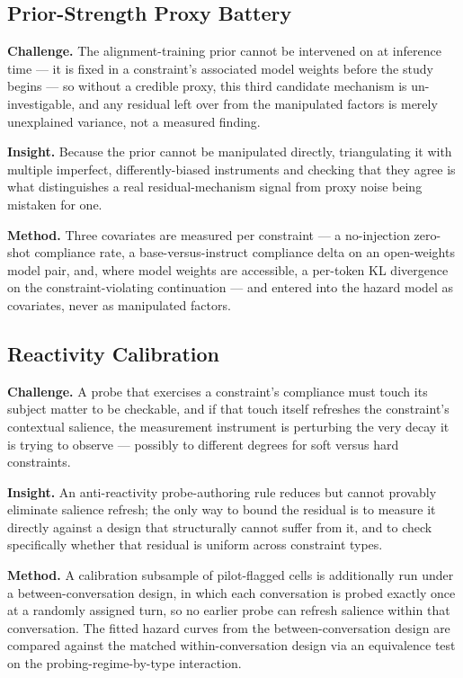 \documentclass[11pt]{article}
\begin{document}
\subsection{Prior-Strength Proxy Battery}
\textbf{Challenge.} The alignment-training prior cannot be intervened on at inference time --- it is fixed in a constraint's associated model weights before the study begins --- so without a credible proxy, this third candidate mechanism is un-investigable, and any residual left over from the manipulated factors is merely unexplained variance, not a measured finding.

\textbf{Insight.} Because the prior cannot be manipulated directly, triangulating it with multiple imperfect, differently-biased instruments and checking that they agree is what distinguishes a real residual-mechanism signal from proxy noise being mistaken for one.

\textbf{Method.} Three covariates are measured per constraint --- a no-injection zero-shot compliance rate, a base-versus-instruct compliance delta on an open-weights model pair, and, where model weights are accessible, a per-token KL divergence on the constraint-violating continuation --- and entered into the hazard model as covariates, never as manipulated factors.

\subsection{Reactivity Calibration}
\textbf{Challenge.} A probe that exercises a constraint's compliance must touch its subject matter to be checkable, and if that touch itself refreshes the constraint's contextual salience, the measurement instrument is perturbing the very decay it is trying to observe --- possibly to different degrees for soft versus hard constraints.

\textbf{Insight.} An anti-reactivity probe-authoring rule reduces but cannot provably eliminate salience refresh; the only way to bound the residual is to measure it directly against a design that structurally cannot suffer from it, and to check specifically whether that residual is uniform across constraint types.

\textbf{Method.} A calibration subsample of pilot-flagged cells is additionally run under a between-conversation design, in which each conversation is probed exactly once at a randomly assigned turn, so no earlier probe can refresh salience within that conversation. The fitted hazard curves from the between-conversation design are compared against the matched within-conversation design via an equivalence test on the probing-regime-by-type interaction.
\end{document}
